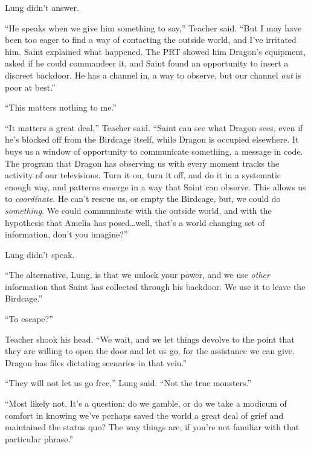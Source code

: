 Lung didn't answer.



``He speaks when we give him something to say,'' Teacher said.  ``But I may have been too eager to find a way of contacting the outside world, and I've irritated him.  Saint explained what happened.  The PRT showed him Dragon's equipment, asked if he could commandeer it, and Saint found an opportunity to insert a discreet backdoor.  He has a channel in, a way to observe, but our channel \emph{out} is poor at best.''



``This matters nothing to me.''



``It matters a great deal,'' Teacher said.  ``Saint can see what Dragon sees, even if he's blocked off from the Birdcage itself, while Dragon is occupied elsewhere.  It buys us a window of opportunity to communicate something, a message in code.  The program that Dragon has observing us with every moment tracks the activity of our televisions.  Turn it on, turn it off, and do it in a systematic enough way, and patterns emerge in a way that Saint can observe.  This allows us to \emph{coordinate}.  He can't rescue us, or empty the Birdcage, but, we could do \emph{something}.  We could communicate with the outside world, and with the hypothesis that Amelia has posed\ldots well, that's a world changing set of information, don't you imagine?''



Lung didn't speak.



``The alternative, Lung, is that we unlock your power, and we use \emph{other} information that Saint has collected through his backdoor.  We use it to leave the Birdcage.''



``To escape?''



Teacher shook his head.  ``We wait, and we let things devolve to the point that they are willing to open the door and let us go, for the assistance we can give.  Dragon has files dictating scenarios in that vein.''



``They will not let us go free,'' Lung said.  ``Not the true monsters.''



``Most likely not.  It's a question: do we gamble, or do we take a modicum of comfort in knowing we've perhaps saved the world a great deal of grief and maintained the status quo?  The way things are, if you're not familiar with that particular phrase.''



